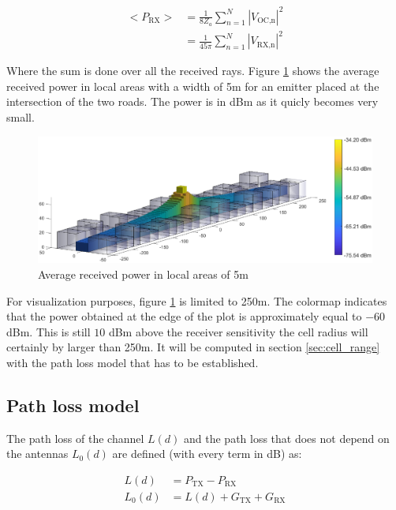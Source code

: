 \documentclass[10pt,a4paper]{ULBreport}
\begin{document}
\begin{align}
    <P_{\text{RX}}> &= \frac{1}{8 Z_a} \sum_{n=1}^{N} \left| V_{\text{OC,n}} \right|^2\\
    &= \frac{1}{45\pi} \sum_{n=1}^{N} \left| V_{\text{RX,n}} \right|^2
    \label{eq:average_power}
\end{align}
\vspace{-1cm}

Where the sum is done over all the received rays. Figure \ref{fig:average_power} shows the average received power in local areas with a width of 5m for an emitter placed at the intersection of the two roads. The power is in dBm as it quicly becomes very small. \\

\begin{figure}[H]
    \centering
    \includegraphics[width=1\textwidth]{3_5.eps}
    \caption{Average received power in local areas of 5m}
    \label{fig:average_power}
\end{figure}

For visualization purposes, figure \ref{fig:average_power} is limited to 250m. The colormap indicates that the power obtained at the edge of the plot is approximately equal to $-60$ dBm. This is still $10$ dBm above the receiver sensitivity the cell radius will certainly by larger than 250m. It will be computed in section \ref{sec:cell_range} with the path loss model that has to be established.

\subsection{Path loss model}
The path loss of the channel $L(d)$ and the path loss that does not depend on the antennas $L_0(d)$ are defined (with every term in dB) as:


\begin{subequations}
    \label{eq:path_loss}
    \begin{align}
        L(d) &= P_{\text{TX}} - P_{\text{RX}}\\
        L_0(d) &= L(d) + G_{\text{TX}} + G_{\text{RX}}
    \end{align}
\end{subequations}
\end{document}
